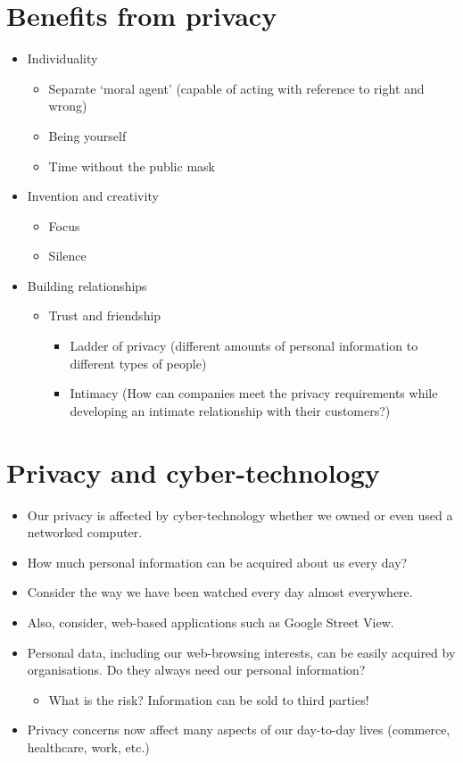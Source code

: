 \documentclass{article}
\begin{document}
\section{Benefits from privacy}
\begin{itemize}
\item Individuality
\begin{itemize}
\item Separate `moral agent' (capable of acting with reference to right and wrong)
\item Being yourself
\item Time without the public mask
\end{itemize}
\item Invention and creativity
\begin{itemize}
\item Focus
\item Silence
\end{itemize}
\item Building relationships
\begin{itemize}
\item Trust and friendship
\begin{itemize}
\item Ladder of privacy (different amounts of personal information to different types of people)
\item Intimacy (How can companies meet the privacy requirements while developing an intimate relationship with their customers?)
\end{itemize}
\end{itemize}
\end{itemize}



\section{Privacy and cyber-technology}
\begin{itemize}
\item Our privacy is affected by cyber-technology whether we owned or even used a networked computer.
\item How much personal information can be acquired about us every day?
\item Consider the way we have been watched every day almost everywhere.
\item Also, consider, web-based applications such as Google Street View.
\item Personal data, including our web-browsing interests, can be easily acquired by organisations. Do they always need our personal information?
\begin{itemize}
\item What is the risk? Information can be sold to third parties!
\end{itemize}
\item Privacy concerns now affect many aspects of our day-to-day lives (commerce, healthcare, work, etc.)
\end{itemize}
\end{document}
